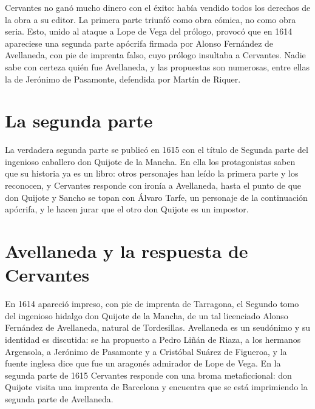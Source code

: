 \documentclass{book}
\begin{document}
Cervantes no ganó mucho dinero con el éxito: había vendido todos los derechos de la obra a su editor. La primera parte triunfó como obra cómica, no como obra seria. Esto, unido al ataque a Lope de Vega del prólogo, provocó que en 1614 apareciese una segunda parte apócrifa firmada por Alonso Fernández de Avellaneda, con pie de imprenta falso, cuyo prólogo insultaba a Cervantes. Nadie sabe con certeza quién fue Avellaneda, y las propuestas son numerosas, entre ellas la de Jerónimo de Pasamonte, defendida por Martín de Riquer.


\section{La segunda parte}

La verdadera segunda parte se publicó en 1615 con el título de Segunda parte del ingenioso caballero don Quijote de la Mancha. En ella los protagonistas saben que su historia ya es un libro: otros personajes han leído la primera parte y los reconocen, y Cervantes responde con ironía a Avellaneda, hasta el punto de que don Quijote y Sancho se topan con Álvaro Tarfe, un personaje de la continuación apócrifa, y le hacen jurar que el otro don Quijote es un impostor.


\section{Avellaneda y la respuesta de Cervantes}

En 1614 apareció impreso, con pie de imprenta de Tarragona, el Segundo tomo del ingenioso hidalgo don Quijote de la Mancha, de un tal licenciado Alonso Fernández de Avellaneda, natural de Tordesillas. Avellaneda es un seudónimo y su identidad es discutida: se ha propuesto a Pedro Liñán de Riaza, a los hermanos Argensola, a Jerónimo de Pasamonte y a Cristóbal Suárez de Figueroa, y la fuente inglesa dice que fue un aragonés admirador de Lope de Vega. En la segunda parte de 1615 Cervantes responde con una broma metaficcional: don Quijote visita una imprenta de Barcelona y encuentra que se está imprimiendo la segunda parte de Avellaneda.
\end{document}
